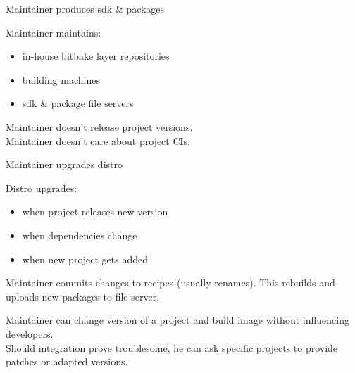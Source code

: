 \documentclass{beamer}
\begin{document}
\begin{frame}{Maintainer produces sdk \& packages}
    \begin{block}{}
        Maintainer maintains:
        \begin{itemize}
            \item{in-house bitbake layer repositories}
            \item{building machines}
            \item{sdk \& package file servers}
        \end{itemize}
    \end{block}
    \begin{block}{}
        \color{red!60!black}
        Maintainer doesn't release project versions. \\
        Maintainer doesn't care about project CIs.
    \end{block}
\end{frame}

\begin{frame}[fragile]{Maintainer upgrades distro}
    \begin{block}{}
        Distro upgrades:
        \begin{itemize}
            \item{when project releases new version}
            \item{when dependencies change}
            \item{when new project gets added}
        \end{itemize}
    \end{block}
    \begin{block}{}
        Maintainer commits changes to recipes (usually renames).
        This rebuilds and uploads new packages to file server.
    \end{block}
    \begin{block}{}
        \color{green!60!black}
        Maintainer can change version of a project
        and build image without influencing developers. \\
        Should integration prove troublesome, he can ask specific
        projects to provide patches or adapted versions.
    \end{block}
\end{frame}
\end{document}
